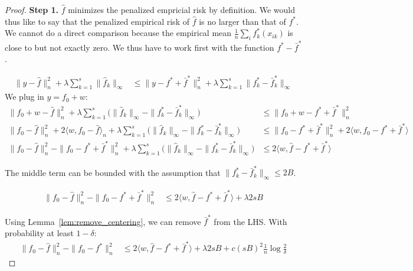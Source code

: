 \begin{proof}
\textbf{Step 1.} $\hat{f}$ minimizes the penalized empricial risk by definition. We would thus like to say that the penalized empirical risk of $\hat{f}$ is no larger than that of $f^*$. We cannot do a direct comparison because the empirical mean $\frac{1}{n} \sum_i f^*_k(x_{ik})$ is close to but not exactly zero. We thus have to work first with the function $f^* - \bar{f}^*$. 

\begin{align*}
\| y - \hat{f} \|_n^2 + \lambda \sum_{k=1}^s \| \hat{f}_k \|_\infty &\leq
  \| y - f^* + \bar{f}^* \|_n^2 + \lambda \sum_{k=1}^s \| f^*_k - \bar{f}^*_k \|_\infty 
\end{align*}
We plug in $y = f_0 + w$:
\begin{align*}
\| f_0 + w - \hat{f} \|_n^2 + \lambda \sum_{k=1}^s \Big( \| \hat{f}_k \|_\infty - 
    \| f^*_k - \bar{f}^*_k \|_\infty \Big) &\leq \|f_0 + w - f^* + \bar{f}^* \|_n^2 \\
\| f_0 - \hat{f} \|_n^2 + 2\langle w, f_0 - \hat{f} \rangle_n 
     +\lambda \sum_{k=1}^s \Big( \| \hat{f}_k \|_\infty - \|f^*_k -\bar{f}^*_k\|_\infty \Big) 
    &\leq \| f_0 - f^* + \bar{f}^* \|_n^2 + 
    2 \langle w, f_0 - f^* + \bar{f}^* \rangle \\
\|f_0 - \hat{f} \|_n^2 - \| f_0 - f^* + \bar{f}^* \|_n^2 + 
    \lambda \sum_{k=1}^s \Big( \| \hat{f}_k \|_\infty - 
 \| f^*_k - \bar{f}^*_k \|_\infty \Big) &\leq 2 \langle w, \hat{f} - f^* + \bar{f}^* \rangle
\end{align*}

The middle term can be bounded with the assumption that $\|f^*_k - \bar{f}^*_k \|_\infty \leq 2B$.

\begin{align*}
\|f_0 - \hat{f} \|_n^2 - \| f_0 - f^* + \bar{f}^* \|_n^2 
   &\leq 2 \langle w, \hat{f} - f^* + \bar{f}^* \rangle + \lambda 2 s B 
\end{align*}

Using Lemma~\ref{lem:remove_centering}, we can remove $\bar{f}^*$ from the LHS. With probability at least $1 - \delta$:
\begin{align}
\label{eqn:first_step_inequality}
\|f_0 - \hat{f} \|_n^2 - \| f_0 - f^* \|_n^2 
   &\leq 2 \langle w, \hat{f} - f^* + \bar{f}^* \rangle + \lambda 2 s B + c(sB)^2 \frac{1}{n} \log \frac{2}{\delta}
\end{align}



\end{proof}
